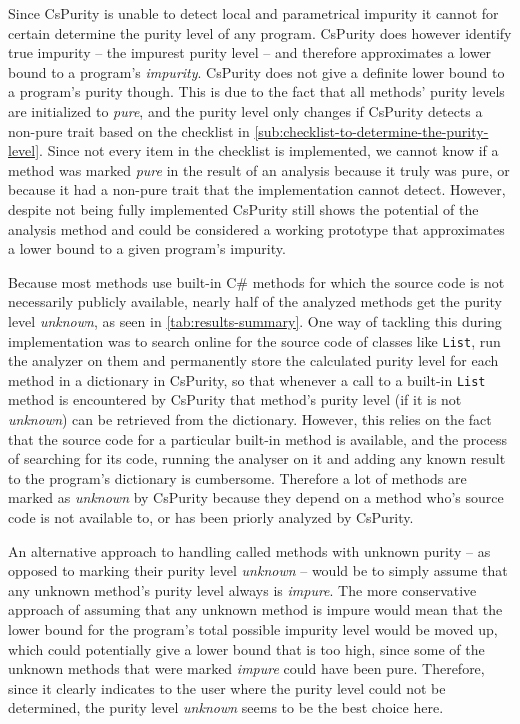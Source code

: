 \documentclass[a4paper,12pt]{article}
\begin{document}
Since CsPurity is unable to detect local and parametrical impurity it cannot for certain determine the purity level of any program. CsPurity does however identify true impurity -- the impurest purity level -- and therefore approximates a lower bound to a program's \textit{impurity}. %
CsPurity does not give a definite lower bound to a program's purity though. This is due to the fact that all methods' purity levels are initialized to \textit{pure}, and the purity level only changes if CsPurity detects a non-pure trait based on the checklist in \autoref{sub:checklist-to-determine-the-purity-level}. Since not every item in the checklist is implemented, we cannot know if a method was marked \textit{pure} in the result of an analysis because it truly was pure, or because it had a non-pure trait that the implementation cannot detect. However, despite not being fully implemented CsPurity still shows the potential of the analysis method and could be considered a working prototype that approximates a lower bound to a given program's impurity.


Because most methods use built-in C\# methods for which the source code is not necessarily publicly available, nearly half of the analyzed methods get the purity level \textit{unknown}, as seen in \autoref{tab:results-summary}. One way of tackling this during implementation was to search online for the source code of classes like \texttt{List}, run the analyzer on them and permanently store the calculated purity level for each method in a dictionary in CsPurity, so that whenever a call to a built-in \texttt{List} method is encountered by CsPurity that method's purity level (if it is not \textit{unknown}) can be retrieved from the dictionary. However, this relies on the fact that the source code for a particular built-in method is available, and the process of searching for its code, running the analyser on it and adding any known result to the program's dictionary is cumbersome. Therefore a lot of methods are marked as \textit{unknown} by CsPurity because they depend on a method who's source code is not available to, or has been priorly analyzed by CsPurity.

An alternative approach to handling called methods with unknown purity -- as opposed to marking their purity level \textit{unknown} -- would be to simply assume that any unknown method's purity level always is \textit{impure}. The more conservative approach of assuming that any unknown method is impure would mean that the lower bound for the program's total possible impurity level would be moved up, which could potentially give a lower bound that is too high, since some of the unknown methods that were marked \textit{impure} could have been pure. Therefore, since it clearly indicates to the user where the purity level could not be determined, the purity level \textit{unknown} seems to be the best choice here.
\end{document}
